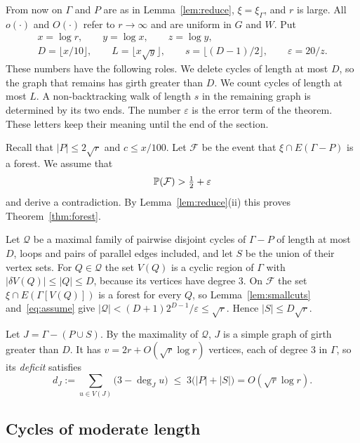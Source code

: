 From now on $\Gamma$ and $P$ are as in Lemma~\ref{lem:reduce}, $\xi=\xi_\Gamma$, and $r$ is large.
All $o(\cdot)$ and $O(\cdot)$ refer to $r\to\infty$ and are uniform in $G$ and $W$. Put
\begin{gather*}
  x=\log r,\qquad y=\log x,\qquad z=\log y,\\
  D=\lfloor x/10\rfloor,\qquad L=\lfloor x\sqrt y\rfloor,\qquad
  s=\lfloor(D-1)/2\rfloor,\qquad\varepsilon=20/z .
\end{gather*}
These numbers have the following roles. We delete cycles of length at most $D$, so the graph that
remains has girth greater than $D$. We count cycles of length at most $L$. A non-backtracking walk
of length $s$ in the remaining graph is determined by its two ends. The number $\varepsilon$ is the
error term of the theorem. These letters keep their meaning until the end of the section.

Recall that $|P|\le2\sqrt r$ and $c\le x/100$. Let $\mathcal{F}$ be the event that
$\xi\cap E(\Gamma-P)$ is a forest. We assume that
\begin{equation}\label{eq:assume}
  \mathbb{P}(\mathcal{F})>\tfrac12+\varepsilon
\end{equation}
and derive a contradiction. By Lemma~\ref{lem:reduce}(ii) this proves Theorem~\ref{thm:forest}.

Let $\mathcal{Q}$ be a maximal family of pairwise disjoint cycles of $\Gamma-P$ of length at most $D$,
loops and pairs of parallel edges included, and let $S$ be the union of their vertex sets. For
$Q\in\mathcal{Q}$ the set $V(Q)$ is a cyclic region of $\Gamma$ with $|\delta V(Q)|\le|Q|\le D$,
because its vertices have degree $3$. On $\mathcal{F}$ the set $\xi\cap E(\Gamma[V(Q)])$ is a forest
for every $Q$, so Lemma~\ref{lem:smallcuts} and~\eqref{eq:assume} give
$|\mathcal{Q}|<(D+1)2^{D-1}/\varepsilon\le\sqrt r$. Hence $|S|\le D\sqrt r$.

Let $J=\Gamma-(P\cup S)$. By the maximality of $\mathcal{Q}$, $J$ is a simple graph of girth greater
than $D$. It has $v=2r+O(\sqrt r\log r)$ vertices, each of degree $3$ in $\Gamma$, so its
\emph{deficit} satisfies
\begin{equation}\label{eq:deficit}
  d_J:=\sum_{u\in V(J)}\bigl(3-\deg_Ju\bigr)\;\le\;3\bigl(|P|+|S|\bigr)=O(\sqrt r\log r).
\end{equation}

\subsection{Cycles of moderate length}

